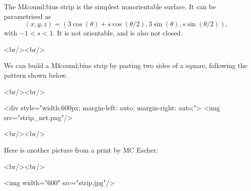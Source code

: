 The M&ouml;bius strip is the simplest nonorientable surface.  It can be 
parametrised as 
$$ (x,y,z) = (3\cos(\theta) + s\cos(\theta/2), 3\sin(\theta), s\sin(\theta/2)), $$
with $-1 \lt s\lt 1$.  It is not orientable, and is also not closed.

<br/><br/>

We can build a M&ouml;bius strip by pasting two sides of a square,
following the pattern shown below.

<br/><br/>

<div style="width:600px; margin-left: auto; margin-right: auto;">
<img src="strip_net.png"/>

<br/><br/>

Here is another picture from a print by MC Escher:

<br/><br/>

<img width="600" src="strip.jpg"/>